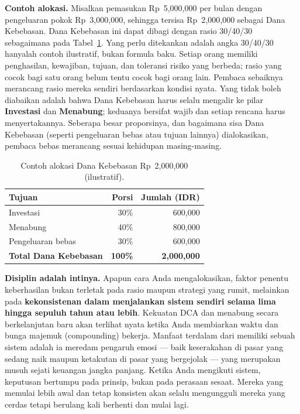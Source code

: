 \documentclass[10pt,a4paper,twocolumn]{article}
\begin{document}
\textbf{Contoh alokasi.} Misalkan pemasukan Rp~5{,}000{,}000 per bulan dengan pengeluaran pokok Rp~3{,}000{,}000, sehingga tersisa Rp~2{,}000{,}000 sebagai Dana Kebebasan. Dana Kebebasan ini dapat dibagi dengan rasio 30/40/30 sebagaimana pada Tabel~\ref{tab:alloc}. Yang perlu ditekankan adalah angka 30/40/30 hanyalah contoh ilustratif, bukan formula baku. Setiap orang memiliki penghasilan, kewajiban, tujuan, dan toleransi risiko yang berbeda; rasio yang cocok bagi satu orang belum tentu cocok bagi orang lain. Pembaca sebaiknya merancang rasio mereka sendiri berdasarkan kondisi nyata. Yang tidak boleh diabaikan adalah bahwa Dana Kebebasan harus selalu mengalir ke pilar \textbf{Investasi} dan \textbf{Menabung}; keduanya bersifat wajib dan setiap rencana harus menyertakannya. Seberapa besar proporsinya, dan bagaimana sisa Dana Kebebasan (seperti pengeluaran bebas atau tujuan lainnya) dialokasikan, pembaca bebas merancang sesuai kehidupan masing-masing.

\begin{table}[t]
\centering
\small
\begin{tabular}{lrr}
\toprule
\rowcolor{accent!15}
\textbf{Tujuan} & \textbf{Porsi} & \textbf{Jumlah (IDR)} \\
\midrule
Investasi          & 30\% & 600{,}000 \\
Menabung           & 40\% & 800{,}000 \\
Pengeluaran bebas  & 30\% & 600{,}000 \\
\midrule
\textbf{Total Dana Kebebasan} & \textbf{100\%} & \textbf{2{,}000{,}000} \\
\bottomrule
\end{tabular}
\caption{Contoh alokasi Dana Kebebasan Rp~2{,}000{,}000 (ilustratif).}
\label{tab:alloc}
\end{table}

\textbf{Disiplin adalah intinya.} Apapun cara Anda mengalokasikan, faktor penentu keberhasilan bukan terletak pada rasio maupun strategi yang rumit, melainkan pada \textbf{kekonsistenan dalam menjalankan sistem sendiri selama lima hingga sepuluh tahun atau lebih}. Kekuatan DCA dan menabung secara berkelanjutan baru akan terlihat nyata ketika Anda membiarkan waktu dan bunga majemuk (compounding) bekerja. Manfaat terdalam dari memiliki sebuah sistem adalah ia meredam pengaruh emosi --- baik keserakahan di pasar yang sedang naik maupun ketakutan di pasar yang bergejolak --- yang merupakan musuh sejati keuangan jangka panjang. Ketika Anda mengikuti sistem, keputusan bertumpu pada prinsip, bukan pada perasaan sesaat. Mereka yang memulai lebih awal dan tetap konsisten akan selalu mengungguli mereka yang cerdas tetapi berulang kali berhenti dan mulai lagi.
\end{document}
